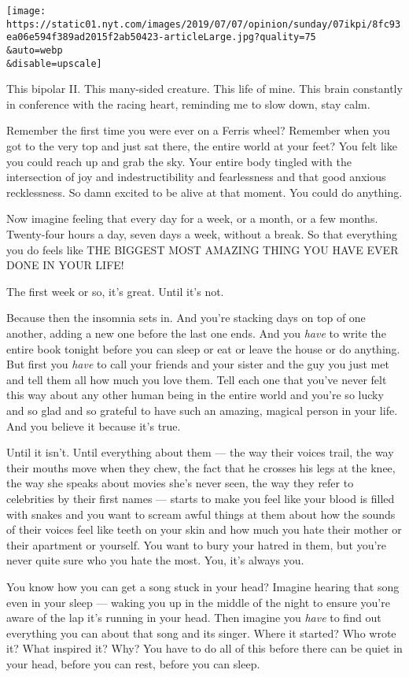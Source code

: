 \texttt{[image: https://static01.nyt.com/images/2019/07/07/opinion/sunday/07ikpi/8fc93ea06e594f389ad2015f2ab50423-articleLarge.jpg?quality=75\\\&auto=webp\\\&disable=upscale]}

This bipolar II. This many-sided creature. This life of mine. This brain
constantly in conference with the racing heart, reminding me to slow
down, stay calm.

Remember the first time you were ever on a Ferris wheel? Remember when
you got to the very top and just sat there, the entire world at your
feet? You felt like you could reach up and grab the sky. Your entire
body tingled with the intersection of joy and indestructibility and
fearlessness and that good anxious recklessness. So damn excited to be
alive at that moment. You could do anything.

Now imagine feeling that every day for a week, or a month, or a few
months. Twenty-four hours a day, seven days a week, without a break. So
that everything you do feels like THE BIGGEST MOST AMAZING THING YOU
HAVE EVER DONE IN YOUR LIFE!

The first week or so, it's great. Until it's not.

Because then the insomnia sets in. And you're stacking days on top of
one another, adding a new one before the last one ends. And you
\emph{have} to write the entire book tonight before you can sleep or eat
or leave the house or do anything. But first you \emph{have} to call
your friends and your sister and the guy you just met and tell them all
how much you love them. Tell each one that you've never felt this way
about any other human being in the entire world and you're so lucky and
so glad and so grateful to have such an amazing, magical person in your
life. And you believe it because it's true.

Until it isn't. Until everything about them --- the way their voices
trail, the way their mouths move when they chew, the fact that he
crosses his legs at the knee, the way she speaks about movies she's
never seen, the way they refer to celebrities by their first names ---
starts to make you feel like your blood is filled with snakes and you
want to scream awful things at them about how the sounds of their voices
feel like teeth on your skin and how much you hate their mother or their
apartment or yourself. You want to bury your hatred in them, but you're
never quite sure who you hate the most. You, it's always you.

You know how you can get a song stuck in your head? Imagine hearing that
song even in your sleep --- waking you up in the middle of the night to
ensure you're aware of the lap it's running in your head. Then imagine
you \emph{have} to find out everything you can about that song and its
singer. Where it started? Who wrote it? What inspired it? Why? You have
to do all of this before there can be quiet in your head, before you can
rest, before you can sleep.


